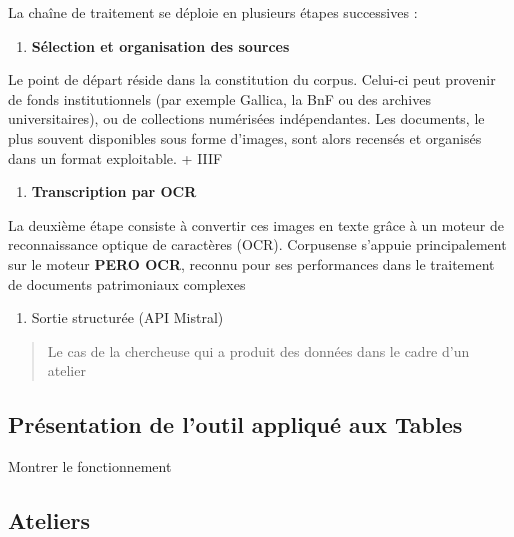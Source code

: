 La chaîne de traitement se déploie en plusieurs étapes successives :

\begin{enumerate}
\item \textbf{Sélection et organisation des sources}  
\end{enumerate}
   Le point de départ réside dans la constitution du corpus. Celui-ci peut provenir de fonds institutionnels (par exemple Gallica, la BnF ou des archives universitaires), ou de collections numérisées indépendantes. Les documents, le plus souvent disponibles sous forme d’images, sont alors recensés et organisés dans un format exploitable. + IIIF

\begin{enumerate}
\item \textbf{Transcription par OCR}  
\end{enumerate}
   La deuxième étape consiste à convertir ces images en texte grâce à un moteur de reconnaissance optique de caractères (OCR). Corpusense s’appuie principalement sur le moteur \textbf{PERO OCR}, reconnu pour ses performances dans le traitement de documents patrimoniaux complexes

\begin{enumerate}
\item Sortie structurée (API Mistral)

\end{enumerate}
\begin{quote}
Le cas de la chercheuse qui a produit des données dans le cadre d'un atelier

\end{quote}
\subsection{Présentation de l'outil appliqué aux Tables}

Montrer le fonctionnement

\subsection{Ateliers}

